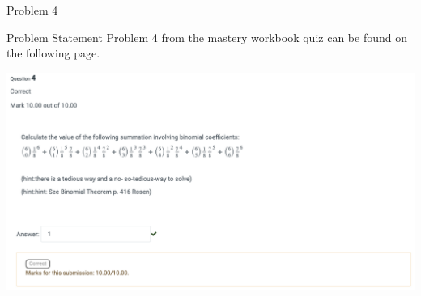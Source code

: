\begin{problem}{Problem 4}
    \begin{statement}{Problem Statement}
        Problem 4 from the mastery workbook quiz can be found on the following page.
    \end{statement}
    \begin{highlight}[Solution]
        \begin{center}
            \includegraphics[width = 1.0\textwidth]{Images/Problem 4.png}
        \end{center}
    \end{highlight}
\end{problem}


